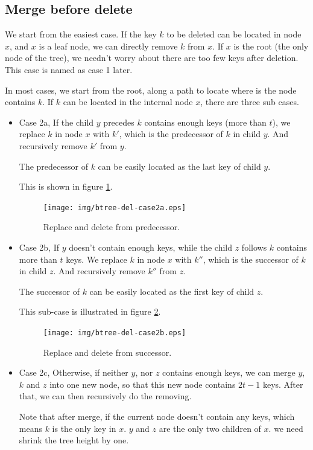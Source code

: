 \documentclass[b5paper]{article}
\begin{document}
\subsection{Merge before delete}

We start from the easiest case. If the key $k$ to be deleted
can be located in node $x$, and $x$ is a leaf node,
we can directly remove $k$ from $x$. If $x$ is the root (the only
node of the tree), we needn't worry about there are too few
keys after deletion. This case is named as case 1 later.

In most cases, we start from the root, along a path to locate
where is the node contains $k$. If $k$ can be located in the
internal node $x$, there are three sub cases.

\begin{itemize}
\item Case 2a, If the child $y$ precedes $k$ contains enough keys (more than $t$),
we replace $k$ in node $x$ with $k'$, which is
the predecessor of $k$ in child $y$. And recursively remove $k'$
from $y$.

The predecessor of $k$ can be easily located as the last key of child
$y$.

This is shown in figure \ref{fig:btree-del-case2a}.

\begin{figure}[htbp]
  \centering
    \texttt{[image: img/btree-del-case2a.eps]}
    \caption{Replace and delete from predecessor.} \label{fig:btree-del-case2a}
\end{figure}

\item Case 2b, If $y$ doesn't contain enough keys, while the child $z$
follows $k$ contains more than $t$ keys. We replace $k$ in node $x$
with $k''$, which is the successor of $k$ in child $z$. And recursively
remove $k''$ from $z$.

The successor of $k$ can be easily located as the first key of child $z$.

This sub-case is illustrated in figure \ref{fig:btree-del-case2b}.

\begin{figure}[htbp]
  \centering
    \texttt{[image: img/btree-del-case2b.eps]}
    \caption{Replace and delete from successor.} \label{fig:btree-del-case2b}
\end{figure}

\item Case 2c, Otherwise, if neither $y$, nor $z$ contains enough keys, we
can merge $y$, $k$ and $z$ into one new node, so that this new node
contains $2t-1$ keys. After that, we can then recursively do the removing.

Note that after merge, if the current node doesn't contain any keys,
which means $k$ is the only key in $x$. $y$ and $z$ are the only two
children of $x$. we need shrink the tree height by one.
\end{itemize}
\end{document}
